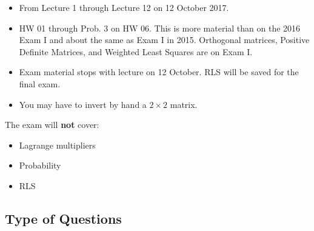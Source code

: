 \documentclass[letterpaper]{article}
\begin{document}
\begin{itemize}
\item From Lecture 1 through Lecture 12 on 12 October 2017.
\item HW 01 through Prob. 3 on HW 06. This is more material than on the 2016 Exam I and about the same as Exam I in 2015. Orthogonal matrices, Positive Definite Matrices, and Weighted Least Squares are on Exam I.
\item Exam material stops with lecture on 12 October. RLS will be saved for the final exam.
\item You may have to invert by hand a $2 \times 2$ matrix.
\end{itemize}
The exam will \textbf{not} cover:
\begin{itemize}
\item Lagrange multipliers
\item Probability
\item RLS
\end{itemize}

\subsection*{Type of Questions}
\end{document}
